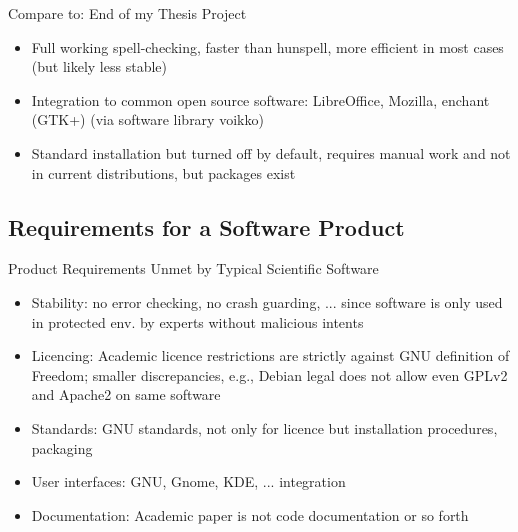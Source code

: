 \documentclass[t,12pt]{beamer}
\begin{document}
\begin{frame}{Compare to: End of my Thesis Project}
    \begin{itemize}
        \item Full working spell-checking, faster than hunspell, more efficient
            in most cases (but likely less stable)
        \item Integration to common open source software: LibreOffice,
            Mozilla, enchant (GTK+) (via software library voikko)
        \item Standard installation but turned off by default, requires manual
            work and not in current distributions, but packages exist
    \end{itemize}
\end{frame}

\subsection{Requirements for a Software Product}

\begin{frame}{Product Requirements Unmet by Typical Scientific Software}
    \begin{itemize}
        \item Stability: no error checking, no crash guarding, ... since software
            is only used in protected env. by experts without malicious intents
        \item Licencing: Academic licence restrictions are strictly against
            GNU definition of Freedom; smaller discrepancies, e.g., Debian legal
            does not allow even GPLv2 and Apache2 on same software
        \item Standards: GNU standards, not only for licence but installation
            procedures, packaging
        \item User interfaces: GNU, Gnome, KDE, ... integration
        \item Documentation: Academic paper is not code documentation or so 
            forth 
    \end{itemize}
\end{frame}
\end{document}

